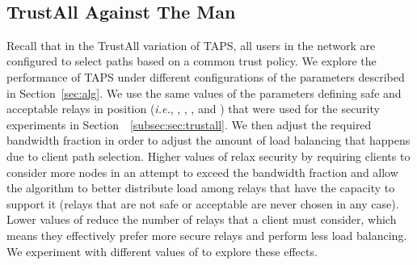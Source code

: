 \documentclass[conference]{styles/IEEEtran}
\renewcommand{\S}{Section~}
\newcommand{\ie}{\emph{i.e.}}
\newcommand{\ps}{TAPS\xspace}
\begin{document}
\begin{figure*}[t]
    \centering
    \\
    \caption{\small Performance of the TrustAll variation of \ps against \textsf{The Man} policy, varying required bandwidth fraction }
    \label{fig:perf-trust-all}
    \vspace{-4mm}
\end{figure*}



\subsection{TrustAll Against \textsf{The Man}}

Recall that in the TrustAll variation of \ps, all users in the network are
configured to select paths based on a common trust policy.  We explore the performance of \ps under different configurations of the parameters described in \S\ref{sec:alg}. We use the same values of the parameters defining safe and acceptable relays in position  (\ie{}, , , , and ) that were used for
the security experiments in \S~\ref{subsec:sec:trustall}.
We then adjust the required bandwidth fraction  in order to
adjust the amount of load balancing that happens due to client path selection. Higher
values of  relax security by requiring clients to consider more
nodes in an attempt to exceed the bandwidth fraction and allow the algorithm
to better distribute load among relays that have the capacity to support it
(relays that are not safe or acceptable are never chosen in
any case). Lower values of  reduce the number of relays that a
client must consider, which means they effectively prefer more secure relays
and perform less load balancing. We experiment with different
values of  to explore these effects.
\end{document}
